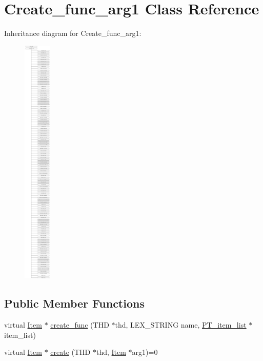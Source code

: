 \hypertarget{classCreate__func__arg1}{}\section{Create\+\_\+func\+\_\+arg1 Class Reference}
\label{classCreate__func__arg1}
Inheritance diagram for Create\+\_\+func\+\_\+arg1\+:\begin{figure}[H]
\begin{center}
\leavevmode
\includegraphics[height=12.000000cm]{classCreate__func__arg1}
\end{center}
\end{figure}
\subsection*{Public Member Functions}
\begin{DoxyCompactItemize}
\item 
virtual \mbox{\hyperlink{classItem}{Item}} $\ast$ \mbox{\hyperlink{classCreate__func__arg1_ac81a14acd40843819ac0da8111760aab}{create\+\_\+func}} (T\+HD $\ast$thd, L\+E\+X\+\_\+\+S\+T\+R\+I\+NG name, \mbox{\hyperlink{classPT__item__list}{P\+T\+\_\+item\+\_\+list}} $\ast$item\+\_\+list)
\item 
virtual \mbox{\hyperlink{classItem}{Item}} $\ast$ \mbox{\hyperlink{classCreate__func__arg1_a3e9a98f755cd82c3e762e334c955a8c9}{create}} (T\+HD $\ast$thd, \mbox{\hyperlink{classItem}{Item}} $\ast$arg1)=0
\end{DoxyCompactItemize}
